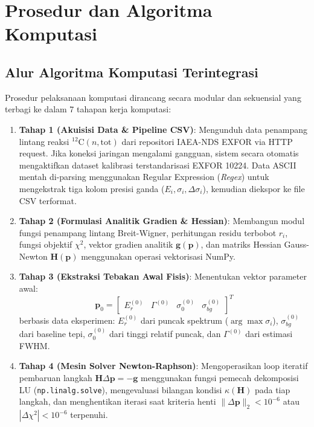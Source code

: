 \section{Prosedur dan Algoritma Komputasi}

\subsection*{Alur Algoritma Komputasi Terintegrasi}
Prosedur pelaksanaan komputasi dirancang secara modular dan sekuensial yang terbagi ke dalam 7 tahapan kerja komputasi:
\begin{enumerate}
    \item \textbf{Tahap 1 (Akuisisi Data \& Pipeline CSV)}: Mengunduh data penampang lintang reaksi $^{12}\text{C}(n,\text{tot})$ dari repositori IAEA-NDS EXFOR via HTTP request. Jika koneksi jaringan mengalami gangguan, sistem secara otomatis mengaktifkan dataset kalibrasi terstandarisasi EXFOR 10224. Data ASCII mentah di-parsing menggunakan Regular Expression (\textit{Regex}) untuk mengekstrak tiga kolom presisi ganda ($E_i, \sigma_i, \Delta\sigma_i$), kemudian diekspor ke file CSV terformat.
    \item \textbf{Tahap 2 (Formulasi Analitik Gradien \& Hessian)}: Membangun modul fungsi penampang lintang Breit-Wigner, perhitungan residu terbobot $r_i$, fungsi objektif $\chi^2$, vektor gradien analitik $\mathbf{g}(\mathbf{p})$, dan matriks Hessian Gauss-Newton $\mathbf{H}(\mathbf{p})$ menggunakan operasi vektorisasi NumPy.
    \item \textbf{Tahap 3 (Ekstraksi Tebakan Awal Fisis)}: Menentukan vektor parameter awal:
    \begin{equation}
        \mathbf{p}_0 = \begin{bmatrix} E_r^{(0)} & \Gamma^{(0)} & \sigma_0^{(0)} & \sigma_{bg}^{(0)} \end{bmatrix}^T
        \label{eq:p0_init}
    \end{equation}
    berbasis data eksperimen: $E_r^{(0)}$ dari puncak spektrum ($\arg\max \sigma_i$), $\sigma_{bg}^{(0)}$ dari baseline tepi, $\sigma_0^{(0)}$ dari tinggi relatif puncak, dan $\Gamma^{(0)}$ dari estimasi FWHM.
    \item \textbf{Tahap 4 (Mesin Solver Newton-Raphson)}: Mengoperasikan loop iteratif pembaruan langkah $\mathbf{H}\Delta\mathbf{p} = -\mathbf{g}$ menggunakan fungsi pemecah dekomposisi LU (\texttt{np.linalg.solve}), mengevaluasi bilangan kondisi $\kappa(\mathbf{H})$ pada tiap langkah, dan menghentikan iterasi saat kriteria henti $\|\Delta\mathbf{p}\|_2 < 10^{-6}$ atau $|\Delta\chi^2| < 10^{-6}$ terpenuhi.

\end{enumerate}
